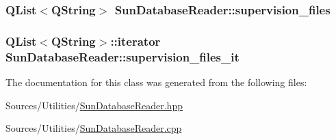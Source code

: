 \hypertarget{class_sun_database_reader_ac5afd4950a668e5cff2bc5c6ea024b60}{
\subsubsection[{supervision\+\_\+files}]{\setlength{\rightskip}{0pt plus 5cm}Q\+List$<$Q\+String$>$ Sun\+Database\+Reader\+::supervision\+\_\+files\hspace{0.3cm}{\ttfamily [private]}}}\label{class_sun_database_reader_ac5afd4950a668e5cff2bc5c6ea024b60}
\hypertarget{class_sun_database_reader_a78e30a0ac9cfa46c23dbdf8d37226b51}{
\subsubsection[{supervision\+\_\+files\+\_\+it}]{\setlength{\rightskip}{0pt plus 5cm}Q\+List$<$Q\+String$>$\+::iterator Sun\+Database\+Reader\+::supervision\+\_\+files\+\_\+it\hspace{0.3cm}{\ttfamily [private]}}}\label{class_sun_database_reader_a78e30a0ac9cfa46c23dbdf8d37226b51}


The documentation for this class was generated from the following files\+:\begin{DoxyCompactItemize}
\item 
Sources/\+Utilities/\hyperlink{_sun_database_reader_8hpp}{Sun\+Database\+Reader.\+hpp}\item 
Sources/\+Utilities/\hyperlink{_sun_database_reader_8cpp}{Sun\+Database\+Reader.\+cpp}\end{DoxyCompactItemize}
